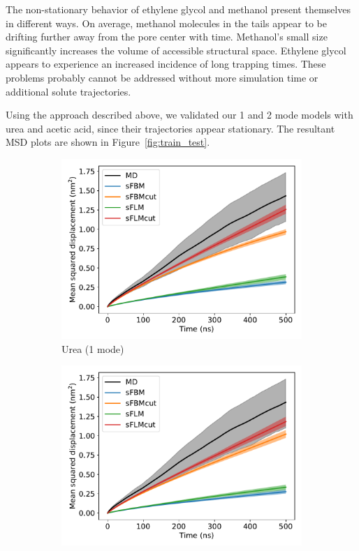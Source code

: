 \documentclass{article}
\begin{document}
  The non-stationary behavior of ethylene glycol and methanol present themselves
  in different ways. On average, methanol molecules in the tails appear to be 
  drifting further away from the pore center with time. Methanol's small size 
  significantly increases the volume of accessible structural space. Ethylene 
  glycol appears to experience an increased incidence of long trapping times. 
  These problems probably cannot be addressed without more simulation time or 
  additional solute trajectories. 

  Using the approach described above, we validated our 1 and 2 mode models with
  urea and acetic acid, since their trajectories appear stationary. The 
  resultant MSD plots are shown in Figure~\ref{fig:train_test}. 
  
  \begin{figure}
  \centering
  \begin{subfigure}{0.45\textwidth}
  \includegraphics[width=\textwidth]{1mode_msd_comparison_URE_train_front.pdf}
  \caption{Urea (1 mode)}
  \end{subfigure}
  \begin{subfigure}{0.45\textwidth}
  \includegraphics[width=\textwidth]{2mode_msd_comparison_URE_train_front.pdf}

\end{subfigure}
\end{figure}
\end{document}
